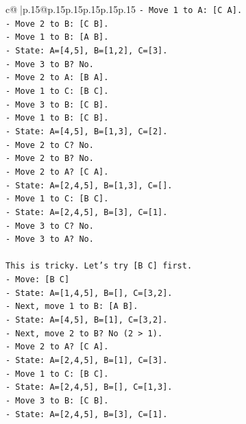 \documentclass{article}
\begin{document}
{\begin{supertabular}{c@{$\;$}|p{.15\linewidth}@{}p{.15\linewidth}p{.15\linewidth}p{.15\linewidth}p{.15\linewidth}p{.15\linewidth}}
{{{\texttt{{-} Move 1 to A: {[}C A{]}.} \\
\texttt{{-} Move 2 to B: {[}C B{]}.} \\
\texttt{{-} Move 1 to B: {[}A B{]}.} \\
\texttt{{-} State: A={[}4,5{]}, B={[}1,2{]}, C={[}3{]}.} \\
\texttt{{-} Move 3 to B? No.} \\
\texttt{{-} Move 2 to A: {[}B A{]}.} \\
\texttt{{-} Move 1 to C: {[}B C{]}.} \\
\texttt{{-} Move 3 to B: {[}C B{]}.} \\
\texttt{{-} Move 1 to B: {[}C B{]}.} \\
\texttt{{-} State: A={[}4,5{]}, B={[}1,3{]}, C={[}2{]}.} \\
\texttt{{-} Move 2 to C? No.} \\
\texttt{{-} Move 2 to B? No.} \\
\texttt{{-} Move 2 to A? {[}C A{]}.} \\
\texttt{{-} State: A={[}2,4,5{]}, B={[}1,3{]}, C={[}{]}.} \\
\texttt{{-} Move 1 to C: {[}B C{]}.} \\
\texttt{{-} State: A={[}2,4,5{]}, B={[}3{]}, C={[}1{]}.} \\
\texttt{{-} Move 3 to C? No.} \\
\texttt{{-} Move 3 to A? No.} \\
\\ 
\texttt{This is tricky. Let's try {[}B C{]} first.} \\
\texttt{{-} Move: {[}B C{]}} \\
\texttt{{-} State: A={[}1,4,5{]}, B={[}{]}, C={[}3,2{]}.} \\
\texttt{{-} Next, move 1 to B: {[}A B{]}.} \\
\texttt{{-} State: A={[}4,5{]}, B={[}1{]}, C={[}3,2{]}.} \\
\texttt{{-} Next, move 2 to B? No (2 > 1).} \\
\texttt{{-} Move 2 to A? {[}C A{]}.} \\
\texttt{{-} State: A={[}2,4,5{]}, B={[}1{]}, C={[}3{]}.} \\
\texttt{{-} Move 1 to C: {[}B C{]}.} \\
\texttt{{-} State: A={[}2,4,5{]}, B={[}{]}, C={[}1,3{]}.} \\
\texttt{{-} Move 3 to B: {[}C B{]}.} \\
\texttt{{-} State: A={[}2,4,5{]}, B={[}3{]}, C={[}1{]}.} \\
}}}
\end{supertabular}}
\end{document}

